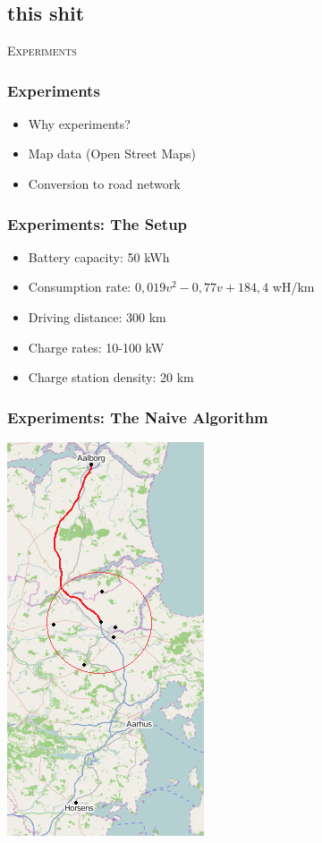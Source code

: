 \section{\scshape }
\subsection{this shit}

\begin{frame}
\center \huge \scshape Experiments
\end{frame}

\begin{frame}
  \frametitle{Experiments}
  \begin{itemize}
  	\item Why experiments?
  	\item Map data (Open Street Maps)
  	\item Conversion to road network
  \end{itemize}
\end{frame}

\begin{frame}
  \frametitle{Experiments: The Setup} 
  \begin{itemize}
  	\item Battery capacity: 50 kWh
  	\item Consumption rate: $0,019v^2 - 0,77v + 184,4$ wH/km
  	\item Driving distance: 300 km
  	\item Charge rates: 10-100 kW
  	\item Charge station density: 20 km
  \end{itemize}
\end{frame}

\begin{frame}
  \frametitle{Experiments: The Naive Algorithm}
  \begin{center}
	  \includegraphics[scale=0.6]{images/AalborgtoHorsens1}  
  \end{center}
\end{frame}

